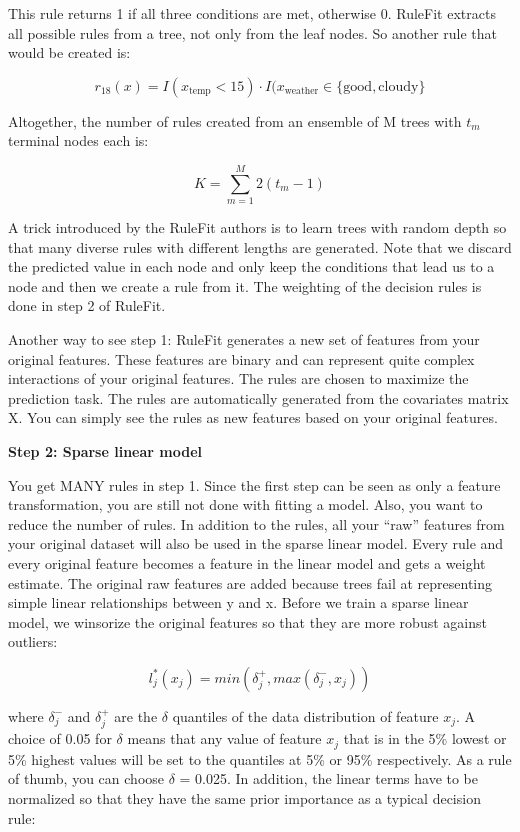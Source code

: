 \documentclass[
  12pt,
]{krantz}
\begin{document}
This rule returns 1 if all three conditions are met, otherwise 0.
RuleFit extracts all possible rules from a tree, not only from the leaf nodes.
So another rule that would be created is:

\[r_{18}(x)=I(x_{\text{temp}}<15)\cdot I(x_{\text{weather}}\in\{\text{good},\text{cloudy}\}\]

Altogether, the number of rules created from an ensemble of M trees with \(t_m\) terminal nodes each is:

\[K=\sum_{m=1}^M2(t_m-1)\]

A trick introduced by the RuleFit authors is to learn trees with random depth so that many diverse rules with different lengths are generated.
Note that we discard the predicted value in each node and only keep the conditions that lead us to a node and then we create a rule from it.
The weighting of the decision rules is done in step 2 of RuleFit.

Another way to see step 1:
RuleFit generates a new set of features from your original features.
These features are binary and can represent quite complex interactions of your original features.
The rules are chosen to maximize the prediction task.
The rules are automatically generated from the covariates matrix X.
You can simply see the rules as new features based on your original features.

\textbf{Step 2: Sparse linear model}

You get MANY rules in step 1.
Since the first step can be seen as only a feature transformation, you are still not done with fitting a model.
Also, you want to reduce the number of rules.
In addition to the rules, all your ``raw'' features from your original dataset will also be used in the sparse linear model.
Every rule and every original feature becomes a feature in the linear model and gets a weight estimate.
The original raw features are added because trees fail at representing simple linear relationships between y and x.
Before we train a sparse linear model, we winsorize the original features so that they are more robust against outliers:

\[l_j^*(x_j)=min(\delta_j^+,max(\delta_j^-,x_j))\]

where \(\delta_j^-\) and \(\delta_j^+\) are the \(\delta\) quantiles of the data distribution of feature \(x_j\).
A choice of 0.05 for \(\delta\) means that any value of feature \(x_j\) that is in the 5\% lowest or 5\% highest values will be set to the quantiles at 5\% or 95\% respectively.
As a rule of thumb, you can choose \(\delta\) = 0.025.
In addition, the linear terms have to be normalized so that they have the same prior importance as a typical decision rule:
\end{document}
